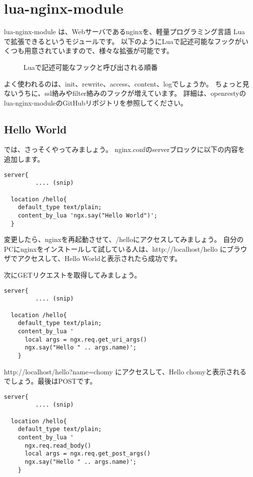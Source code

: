 \chapter*{lua-nginx-module}

lua-nginx-module は、Webサーバであるnginxを、軽量プログラミング言語
Luaで拡張できるというモジュールです。
以下のようにLuaで記述可能なフックがいくつも用意されていますので、様々な拡張が可能です。

\begin{figure}
\begin{center}
\end{center}
\caption{Luaで記述可能なフックと呼び出される順番}
\end{figure}

よく使われるのは、init、rewrite、access、content、logでしょうか。
ちょっと見ないうちに、ssl絡みやfilter絡みのフックが増えています。
詳細は、openrestyのlua-nginx-moduleのGitHubリポジトリを参照してください。

\section*{Hello World}
では、さっそくやってみましょう。
nginx.confのserverブロックに以下の内容を追加します。
\begin{lstlisting}[caption=hello world,label=list:hello-world]
server{
         .... (snip)

  location /hello{
    default_type text/plain;
    content_by_lua 'ngx.say("Hello World")';
  }
\end{lstlisting}

変更したら、nginxを再起動させて、/helloにアクセスしてみましょう。
自分のPCにnginxをインストールして試している人は、http://localhost/hello
にブラウザでアクセスして、Hello Worldと表示されたら成功です。

次にGETリクエストを取得してみましょう。
\begin{lstlisting}[caption=GETパラメータの取得,label=list:get]
server{
         .... (snip)

  location /hello{
    default_type text/plain;
    content_by_lua '
      local args = ngx.req.get_uri_args()
      ngx.say("Hello " .. args.name)';
    }
\end{lstlisting}
http://localhost/hello?name=chomy にアクセスして、Hello chomyと表示される
でしょう。最後はPOSTです。
\begin{lstlisting}[caption=POSTパラメータの取得,label=list:get]
server{
         .... (snip)

  location /hello{
    default_type text/plain;
    content_by_lua '
      ngx.req.read_body()
      local args = ngx.req.get_post_args()
      ngx.say("Hello " .. args.name)';
    }
\end{lstlisting}

